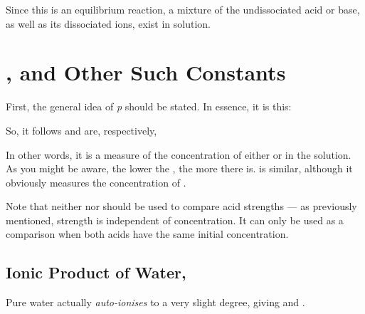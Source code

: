 				Since this is an equilibrium reaction, a mixture of the undissociated acid or base, as well as its dissociated ions,
				exist in solution.




	\section{\MpH{}, \MpOH{} and Other Such Constants}

		First, the general idea of \textit{p} should be stated. In essence, it is this:


		So, it follows \pH{} and \pOH{} are, respectively,


		In other words, it is a measure of the concentration of either  or  in the solution. As you might be aware, the
		lower the \pH{}, the more  there is. \pOH{} is similar, although it obviously measures the concentration of .

		Note that neither \pH{} nor \pOH{} should be used to compare acid strengths --- as previously mentioned, strength is independent
		of concentration. It can only be used as a comparison when both acids have the same initial concentration.


		\pagebreak
		\subsection{Ionic Product of Water, \MKw{}}

			Pure water actually \textit{auto-ionises} to a very slight degree, giving  and .


